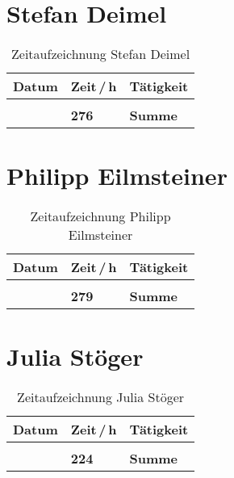 \section{Stefan Deimel}
\begin{longtable}{>{\centering\arraybackslash}m{70px} >{\centering\arraybackslash}m{50px} p{\textwidth-120px}}
	\hline
	\textbf{Datum} & \textbf{Zeit\,/\,h} & \textbf{Tätigkeit}\\\hline
    \endhead
	\caption{Zeitaufzeichnung Stefan Deimel}\\
	\endfoot
    
    & \textbf{276} & \textbf{Summe}\\\hline
\end{longtable}

\clearpage
\section{Philipp Eilmsteiner}
\begin{longtable}{>{\centering\arraybackslash}m{70px} >{\centering\arraybackslash}m{50px} p{\textwidth-120px}}
	\hline
	\textbf{Datum} & \textbf{Zeit\,/\,h} & \textbf{Tätigkeit}\\\hline
    \endhead
	\caption{Zeitaufzeichnung Philipp Eilmsteiner}\\
	\endfoot
    
    & \textbf{279} & \textbf{Summe}\\\hline
\end{longtable}

\clearpage
\section{Julia Stöger}
\begin{longtable}{>{\centering\arraybackslash}m{70px} >{\centering\arraybackslash}m{50px} p{\textwidth-120px}}
	\hline
	\textbf{Datum} & \textbf{Zeit\,/\,h} & \textbf{Tätigkeit}\\\hline
    \endhead
	\caption{Zeitaufzeichnung Julia Stöger}\\
	\endfoot
    
    & \textbf{224} & \textbf{Summe}\\\hline
\end{longtable}

